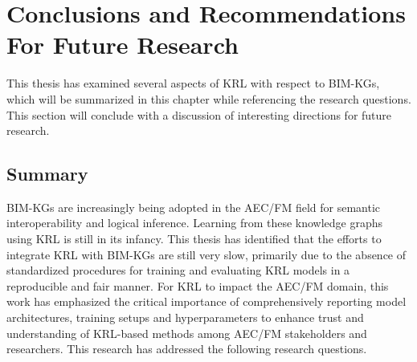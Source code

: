 \chapter{Conclusions and Recommendations For Future Research} 
\label{chap:conclusions}

This thesis has examined several aspects of \ac{KRL} with respect to \acp{BIM-KG}, which will be summarized in this chapter while referencing the research questions. This section will conclude with a discussion of interesting directions for future research.

\section{Summary}
\acp{BIM-KG} are increasingly being adopted in the \ac{AEC/FM} field for semantic interoperability and logical inference. Learning from these knowledge graphs using \ac{KRL} is still in its infancy. This thesis has identified that the efforts to integrate \ac{KRL} with \acp{BIM-KG} are still very slow, primarily due to the absence of standardized procedures for training and evaluating \ac{KRL} models in a reproducible and fair manner. For \ac{KRL} to impact the \ac{AEC/FM} domain, this work has emphasized the critical importance of comprehensively reporting model architectures, training setups and hyperparameters to enhance trust and understanding of \ac{KRL}-based methods among \ac{AEC/FM} stakeholders and researchers. This research has addressed the following research questions. 


